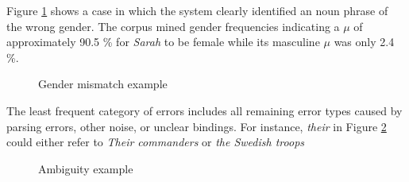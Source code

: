 Figure \ref{figure:wrongGenderError} shows a case in which the system clearly identified an noun phrase of the wrong gender. The corpus mined gender frequencies indicating a $\mu$  of approximately 90.5 \% for \textit{Sarah} to be female while its masculine $\mu$ was only 2.4 \%.

\begin{figure}[h]
\centering
\caption{Gender mismatch example}
	\label{figure:wrongGenderError}
\end{figure}

The least frequent category of errors includes all remaining error types caused by parsing errors, other noise, or unclear bindings. For instance, \textit{their} in Figure \ref{figure:otherError} could either refer to \textit{Their commanders} or \textit{the Swedish troops}

\begin{figure}[h]
\centering
\caption{Ambiguity example}
	\label{figure:otherError}
\end{figure}


